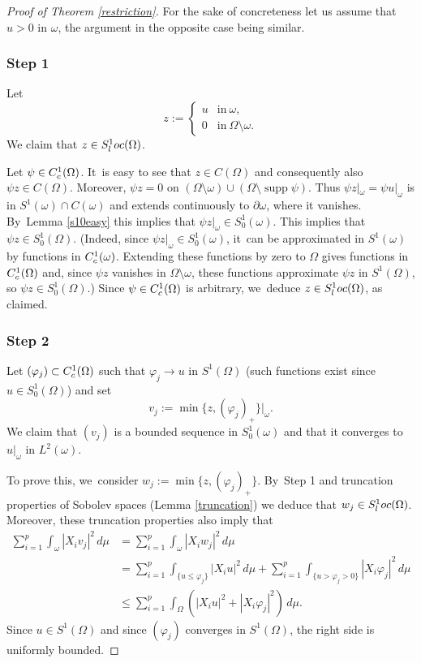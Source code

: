 \documentclass[11pt]{article}
\newcommand{\rc}{\textup{c}}
\newcommand{\loc}{\textup{loc}}
\theoremstyle{definition}
\let\phi\varphi
\newcommand{\1}{\mathbbm{1}}
\DeclareMathOperator{\supp}{supp}
\numberwithin{equation}{section}
\begin{document}
\begin{proof}[Proof of Theorem \ref{restriction}]
For the sake of concreteness let us assume that $u> 0$ in $\omega$, the argument in the opposite case being similar.

\subsubsection*{Step 1} Let
\[
z:= \begin{cases} u & \text{in}\ \omega,\\ 0 & \text{in}\ \Omega\setminus\omega. \end{cases}
\]
We claim that $z\in S^1_\loc(\Omega)$.

Let $\psi\in C^1_\rc(\Omega)$. It~is easy to see that $z\in C(\Omega)$ and consequently also $\psi z\in C(\Omega)$. Moreover, $\psi z=0$ on $(\Omega\setminus\omega)\cup(\Omega\setminus\supp\psi)$. Thus $\psi z|_\omega = \psi u|_\omega$ is in $S^1(\omega)\cap C(\omega)$ and extends continuously to $\partial\omega$, where it vanishes. By~Lemma \ref{s10easy} this implies that $\psi z|_\omega \in S^1_0(\omega)$. This implies that $\psi z\in S^1_0(\Omega)$. (Indeed, since $\psi z|_\omega\in S^1_0(\omega)$, it~can be approximated in $S^1(\omega)$ by functions in $C^1_\rc(\omega)$. Extending these functions by zero to $\Omega$ gives functions in $C^1_\rc(\Omega)$ and, since $\psi z$ vanishes in $\Omega\setminus\omega$, these functions approximate $\psi z$ in $S^1(\Omega)$, so $\psi z\in S^1_0(\Omega)$.) Since $\psi\in C^1_\rc(\Omega)$ is arbitrary, we~deduce $z\in S^1_\loc(\Omega)$, as claimed.

\subsubsection*{Step 2} Let $(\phi_j)\subset C^1_\rc(\Omega)$ such that $\phi_j\to u$ in $S^1(\Omega)$ (such functions exist since $u\in S^1_0(\Omega)$) and set
\[
v_j := \min\{ z, (\phi_j)_+ \}|_\omega.
\]
We claim that $(v_j)$ is a bounded sequence in $S^1_0(\omega)$ and that it converges to $u|_\omega$ in $L^2(\omega)$.

To prove this, we~consider $w_j:=\min\{ z, (\phi_j)_+ \}$. By~Step 1 and truncation properties of Sobolev spaces (Lemma \ref{truncation}) we deduce that $w_j\in S^1_\loc(\Omega)$. Moreover, these truncation properties also imply that
\begin{align*}
\sum_{i=1}^p \int_\omega |X_i v_j|^2\,d\mu & = \sum_{i=1}^p \int_\omega |X_i w_j|^2\,d\mu \\
& = \sum_{i=1}^p \int_{\{u \leq \phi_j \}} |X_i u|^2\,d\mu + \sum_{i=1}^p \int_{\{ u> \phi_j >0 \}} |X_i \phi_j|^2\,d\mu \\
& \leq \sum_{i=1}^p \int_\Omega (|X_i u|^2 + |X_i \phi_j|^2)\,d\mu.
\end{align*}
Since $u\in S^1(\Omega)$ and since $(\phi_j)$ converges in $S^1(\Omega)$, the right side is uniformly bounded.


\end{proof}
\end{document}
